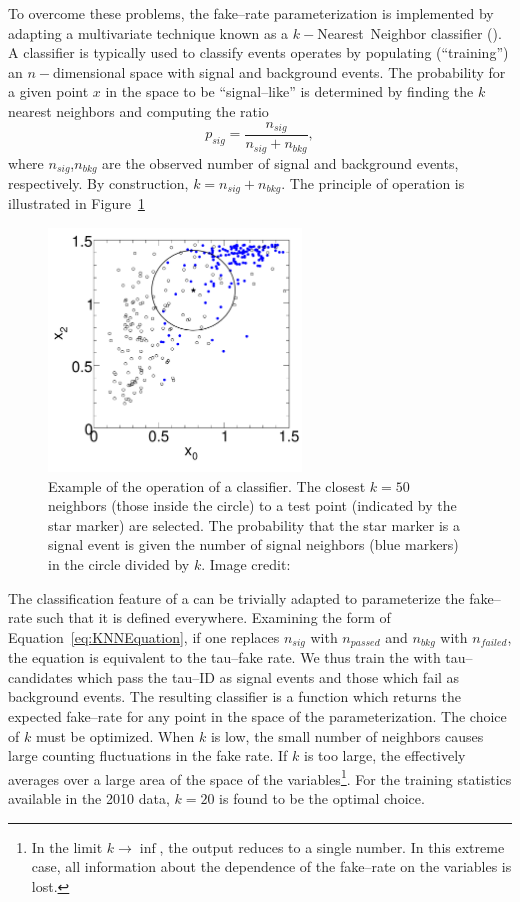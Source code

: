 To overcome these problems, the fake--rate parameterization is implemented by
adapting a multivariate technique known as a $k-$Nearest~Neighbor classifier
(\kNN).  A \kNN classifier is typically used to classify events operates by
populating (``training'') an $n-$dimensional space with signal and background
events.  The probability for a given point $x$ in the space to be
``signal--like'' is determined by finding the $k$ nearest neighbors and
computing the ratio
\begin{equation}
  p_{sig} = \frac{n_{sig}}{n_{sig} + n_{bkg}},
  \label{eq:KNNEquation}
\end{equation}
where $n_{sig}$,$n_{bkg}$ are the observed number of signal and background events,
respectively. By construction, $k = n_{sig} + n_{bkg}$.  The principle of
operation is illustrated in Figure~\ref{fig:KNN}
\begin{figure}
  \centering
  \includegraphics[width=0.6\textwidth]{backgrounds_chapter/figures/knn_3d_s13_b7_x02.pdf}
  \caption[$k-$Nearest Neighbor classifier example]{Example of the operation of
  a \kNN classifier.  The closest $k=50$ neighbors (those inside the circle) to a
  test point (indicated by the star marker) are selected. The probability that
  the star marker is a signal event is given the number of signal neighbors (blue
  markers) in the circle divided by $k$. Image credit:~\cite{TMVA}}
  \label{fig:KNN}
\end{figure}

The classification feature of a \kNN can be trivially adapted to parameterize
the fake--rate such that it is defined everywhere.  Examining the form of
Equation~\ref{eq:KNNEquation}, if one replaces $n_{sig}$ with $n_{passed}$ and
$n_{bkg}$ with $n_{failed}$, the equation is equivalent to the tau--fake rate.
We thus train the \kNN with tau--candidates which pass the tau--ID as signal
events and those which fail as background events. The resulting classifier is a
function which returns the expected fake--rate for any point in the space of the
parameterization.  The choice of $k$ must be optimized.  When $k$ is low, the
small number of neighbors causes large counting fluctuations in the fake rate.
If $k$ is too large, the \kNN effectively averages over a large area of the
space of the variables\footnote{In the limit $k\to\inf$, the \kNN output reduces to a
single number.  In this extreme case, all information about the dependence of
the fake--rate on the variables is lost.}.  For the training statistics
available in the 2010 data, $k=20$ is found to be the optimal choice.

